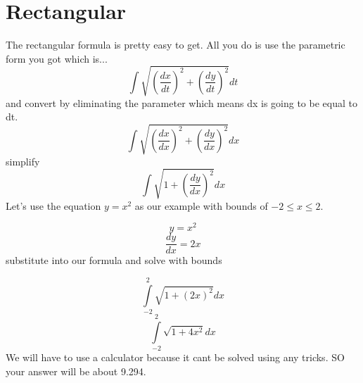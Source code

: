 \documentclass[a4paper,openright, 14pt]{article}
\begin{document}
\section*{Rectangular}
The rectangular formula is pretty easy to get. All you do is use the parametric form you got which is...
$$\int\sqrt{(\frac{dx}{dt})^2+(\frac{dy}{dt})^2}dt$$
and convert by eliminating the parameter which means dx is going to be equal to dt.
$$\int\sqrt{(\frac{dx}{dx})^2+(\frac{dy}{dx})^2}dx$$
simplify
$$\int\sqrt{1+(\frac{dy}{dx})^2}dx$$
Let's use the equation $y=x^2$ as our example with bounds of $-2\leq x\leq 2$.

$$y=x^2$$
$$\frac{dy}{dx}=2x$$
substitute into our formula and solve with bounds

$$\int\limits_{-2}^2\sqrt{1+(2x)^2}dx$$
$$\int\limits_{-2}^2\sqrt{1+4x^2}dx$$
We will have to use a calculator because it cant be solved using any tricks. SO your answer will be about 9.294.
\end{document}
